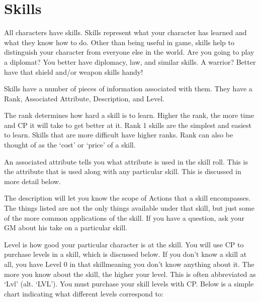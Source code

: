 \documentclass[twoside]{book}
\begin{document}
    

\section{Skills}
    
    {  
     All characters have skills. Skills represent what your
             character has learned and what they know how to do. Other
             than being useful in game, skills help to distinguish your
             character from everyone else in the world. Are you going to
             play a diplomat? You better have diplomacy, law, and similar
             skills. A warrior? Better have that shield and/or weapon
             skills handy! 
    }
  
    {  
     Skills have a number of pieces of information
             associated with them. They have a Rank, Associated
             Attribute, Description, and Level. 
    }
  
    {  
     The rank determines how hard a skill is to learn.
             Higher the rank, the more time and CP it will take to get
             better at it. Rank 1 skills are the simplest and easiest to
             learn. Skills that are more difficult have higher ranks.
             Rank can also be thought of as the `cost' or
             `price' of a skill. 
    }
  
    {  
     An associated attribute tells you what attribute is
             used in the skill roll. This is the attribute that is used
             along with any particular skill. This is discussed in more
             detail below. 
    }
  
    {  
     The description will let you know the scope of Actions
             that a skill encompasses. The things listed are not the only
             things available under that skill, but just some of the more
             common applications of the skill. If you have a question,
             ask your GM about his take on a particular skill. 
    }
  
    {  
     Level is how good your particular character is at the
             skill. You will use CP to purchase levels in a skill, which
             is discussed below. If you don't know a skill at all,
             you have Level 0 in that skillmeaning you don't
             know anything about it. The more you know about the skill,
             the higher your level. This is often abbreviated as
             `Lvl' (alt. `LVL'). You must
             purchase your skill levels with CP. Below is a simple chart
             indicating what different levels correspond to: 
    }
  
\end{document}
